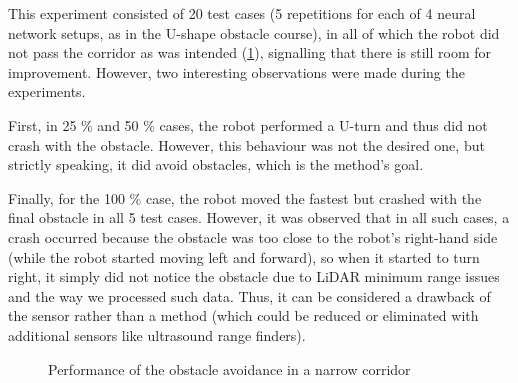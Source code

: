 This experiment consisted of 20 test cases (5 repetitions for each of 4 neural network setups, as in the U-shape obstacle course), in all of which the robot did not pass the corridor as was intended (\cref{fig:Fig10}), signalling that there is still room for improvement. However, two interesting observations were made during the experiments. 

First, in 25 \% and 50 \% cases, the robot performed a U-turn and thus did not crash with the obstacle. However, this behaviour was not the desired one, but strictly speaking, it did avoid obstacles, which is the method's goal. 

Finally, for the 100 \% case, the robot moved the fastest but crashed with the final obstacle in all 5 test cases. However, it was observed that in all such cases, a crash occurred because the obstacle was too close to the robot’s right-hand side (while the robot started moving left and forward), so when it started to turn right, it simply did not notice the obstacle due to LiDAR minimum range issues and the way we processed such data. Thus, it can be considered a drawback of the sensor rather than a method (which could be reduced or eliminated with additional sensors like ultrasound range finders).

\begin{figure}
    \centering
    \vfill
    \caption{Performance of the obstacle avoidance in a narrow corridor}
    \label{fig:Fig10}
\end{figure}

